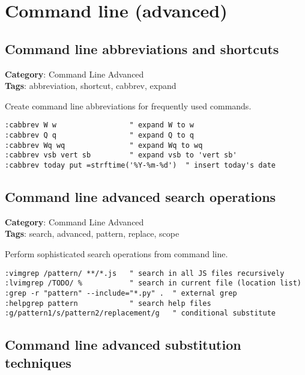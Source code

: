 {{{\chapter{Command line (advanced)}
\section{Command line abbreviations and shortcuts}

\textbf{Category}: Command Line Advanced\\ \textbf{Tags}: abbreviation, shortcut, cabbrev, expand
\vspace{0.5cm}

Create command line abbreviations for frequently used commands.

\begin{Exa*}{}
\begin{Verbatim}[fontsize=\footnotesize, breaklines, breakanywhere]
:cabbrev W w                 " expand W to w
:cabbrev Q q                 " expand Q to q  
:cabbrev Wq wq               " expand Wq to wq
:cabbrev vsb vert sb         " expand vsb to 'vert sb'
:cabbrev today put =strftime('%Y-%m-%d')  " insert today's date
\end{Verbatim}
\end{Exa*}

\section{Command line advanced search operations}

\textbf{Category}: Command Line Advanced\\ \textbf{Tags}: search, advanced, pattern, replace, scope
\vspace{0.5cm}

Perform sophisticated search operations from command line.

\begin{Exa*}{}
\begin{Verbatim}[fontsize=\footnotesize, breaklines, breakanywhere]
:vimgrep /pattern/ **/*.js   " search in all JS files recursively
:lvimgrep /TODO/ %           " search in current file (location list)
:grep -r "pattern" --include="*.py" .  " external grep
:helpgrep pattern            " search help files
:g/pattern1/s/pattern2/replacement/g   " conditional substitute
\end{Verbatim}
\end{Exa*}

\section{Command line advanced substitution techniques}

}}}
